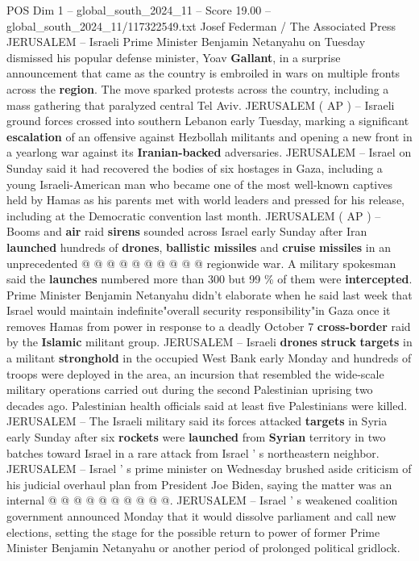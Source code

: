 \begin{textsample}{POS Dim 1 – global\_south\_2024\_11 – Score 19.00 – global\_south\_2024\_11/117322549.txt}  \label{ex:f1_pos_176}
Josef Federman / The Associated Press JERUSALEM -- Israeli Prime Minister Benjamin Netanyahu on Tuesday dismissed his popular defense minister, Yoav \textbf{Gallant}, in a surprise announcement that came as the country is embroiled in wars on multiple fronts across the \textbf{region}.
The move sparked protests across the country, including a mass gathering that paralyzed central Tel Aviv.
JERUSALEM ( AP ) -- Israeli ground forces crossed into southern Lebanon early Tuesday, marking a significant \textbf{escalation} of an offensive against Hezbollah militants and opening a new front in a yearlong war against its \textbf{Iranian-backed} adversaries.
JERUSALEM -- Israel on Sunday said it had recovered the bodies of six hostages in Gaza, including a young Israeli-American man who became one of the most well-known captives held by Hamas as his parents met with world leaders and pressed for his release, including at the Democratic convention last month.
JERUSALEM ( AP ) -- Booms and \textbf{air} raid \textbf{sirens} sounded across Israel early Sunday after Iran \textbf{launched} hundreds of \textbf{drones}, \textbf{ballistic} \textbf{missiles} and \textbf{cruise} \textbf{missiles} in an unprecedented @ @ @ @ @ @ @ @ @ @ regionwide war.
A military spokesman said the \textbf{launches} numbered more than 300 but 99 \% of them were \textbf{intercepted}.
Prime Minister Benjamin Netanyahu didn't elaborate when he said last week that Israel would maintain indefinite"overall security responsibility"in Gaza once it removes Hamas from power in response to a deadly October 7 \textbf{cross-border} raid by the \textbf{Islamic} militant group.
JERUSALEM -- Israeli \textbf{drones} \textbf{struck} \textbf{targets} in a militant \textbf{stronghold} in the occupied West Bank early Monday and hundreds of troops were deployed in the area, an incursion that resembled the wide-scale military operations carried out during the second Palestinian uprising two decades ago.
Palestinian health officials said at least five Palestinians were killed.
JERUSALEM -- The Israeli military said its forces attacked \textbf{targets} in Syria early Sunday after six \textbf{rockets} were \textbf{launched} from \textbf{Syrian} territory in two batches toward Israel in a rare attack from Israel ' s northeastern neighbor.
JERUSALEM -- Israel ' s prime minister on Wednesday brushed aside criticism of his judicial overhaul plan from President Joe Biden, saying the matter was an internal @ @ @ @ @ @ @ @ @ @.
JERUSALEM -- Israel ' s weakened coalition government announced Monday that it would dissolve parliament and call new elections, setting the stage for the possible return to power of former Prime Minister Benjamin Netanyahu or another period of prolonged political gridlock.

\end{textsample}
